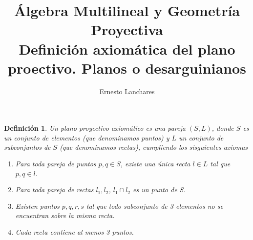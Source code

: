 \documentclass[12pt,a4paper]{article}
\theoremstyle{break}
\newtheorem{defi}{Definición}
\begin{document}
\date{}

\title{\textbf{Álgebra Multilineal y Geometría Proyectiva} \\
\small{Definición axiomática del plano proectivo. Planos o desarguinianos}}
\author{Ernesto Lanchares}
\maketitle

\begin{defi}
	Un plano proyectivo axiomático es una pareja $(S,L)$, donde $S$ es un conjunto
	de elementos (que  denominamos puntos) y $L$ un conjunto de subconjuntos de $S$
	(que denominamos rectas), cumpliendo los sisguientes axiomas
	\begin{enumerate}[\bf {A}1]
		\item\label{item:a1} Para toda pareja de puntos $p,q \in S$, existe una
			única recta $l \in L$ tal que $p,q \in l$.
		\item\label{item:a2} Para toda pareja de rectas $l_1, l_2$,
			$l_1 \cap l_2$ es un punto de S.
		\item\label{item:a3} Existen puntos $p,q,r,s$ tal que todo subconjunto
			de 3 elementos no se encuentran sobre la misma recta.
		\item\label{item:a4} Cada recta contiene al menos 3 puntos.
	\end{enumerate}
\end{defi}
\end{document}
